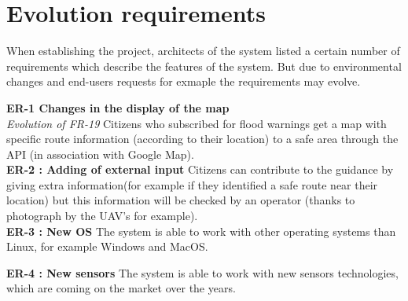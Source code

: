 \section{Evolution requirements}
When establishing the project, architects of the system listed a certain number of requirements which describe the features of the system. But due to environmental changes and end-users requests for exmaple the requirements may evolve.

\textbf{ER-1 Changes in the display of the map } \\
\textit { Evolution of FR-19 } Citizens who subscribed for flood warnings get a map with specific route information (according to their location) to a safe area through the API (in association with Google Map). \\

\textbf{ER-2 : Adding of external input} Citizens can contribute to the guidance by giving extra information(for example if they identified a safe route near their location) but this information will be checked by an operator (thanks to photograph by the UAV's for example). \\

\textbf{ER-3 : New OS } The system is able to work with other operating systems than Linux, for example Windows and MacOS. %


\textbf{ER-4 : New sensors } The system is able to work with new sensors technologies, which are coming on the market over the years.